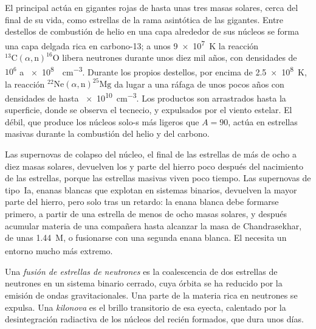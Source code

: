 El  principal actúa en gigantes rojas de hasta unas tres masas solares, cerca del
final de su vida, como estrellas de la rama asintótica de las gigantes. Entre destellos
de combustión de helio en una capa alrededor de sus núcleos se forma una capa delgada rica en
carbono-13; a unos \qty{9e7}{K} la reacción
$^{13}\mathrm{C}(\alpha,\mathrm{n})^{16}\mathrm{O}$ libera neutrones
durante unos diez mil años, con densidades de $10^6$ a
\qty{e8}{.cm^{-3}}. Durante los propios destellos, por encima de
\qty{2.5e8}{K}, la reacción $^{22}\mathrm{Ne}(\alpha,\mathrm{n})^{25}\mathrm{Mg}$
da lugar a una ráfaga de unos pocos años con densidades de hasta \qty{e10}{cm^{-3}}. Los productos
son arrastrados hasta la superficie, donde se observa el tecnecio, y expulsados
por el viento estelar. El  débil, que produce los núcleos solo-s
más ligeros que $A = 90$, actúa en estrellas masivas durante la combustión del helio y
del carbono.

Las supernovas de colapso del núcleo, el final de las estrellas de más de ocho a diez
masas solares, devuelven los  y parte del hierro poco después del
nacimiento de las estrellas, porque las estrellas masivas viven poco tiempo. Las supernovas de tipo~Ia,
enanas blancas que explotan en sistemas binarios, devuelven la mayor parte del
hierro, pero solo tras un retardo: la enana blanca debe formarse primero, a partir de una
estrella de menos de ocho masas solares, y después acumular materia de una
compañera hasta alcanzar la masa de Chandrasekhar, de unas
\qty{1.44}{M_\odot}, o fusionarse con una segunda enana blanca. El  necesita un entorno mucho más
extremo.

\begin{definition}\label{def:b3:origin-of-elements:kilonova}
Una \emph{fusión de estrellas de neutrones} es la
coalescencia de dos estrellas de neutrones en un sistema binario cerrado, cuya órbita se ha
reducido por la emisión de ondas gravitacionales. Una parte de la materia rica en neutrones
se expulsa. Una \emph{kilonova} es el brillo transitorio
de esa eyecta, calentado por la desintegración radiactiva de los núcleos
del  recién formados, que dura unos días.
\end{definition}

